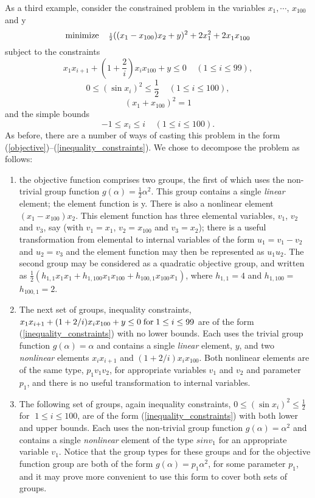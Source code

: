 \documentclass[a4paper]{article}
\newcommand{\beqn}[1]{\begin{equation}\label{#1}}
\newcommand{\eeqn}{\end{equation}}
\newcommand{\req}[1]{(\ref{#1})}
\newcommand{\ms}{\;\;\;\;}
\newcommand{\sfrac}[2]{{\scriptstyle \frac{#1}{#2}}}
\newcommand{\half}{\sfrac{1}{2}}
\begin{document}
As a third example, consider the constrained problem in the variables
$x_1 ,\cdots$, $x_{100}$ and y
\beqn{1.6.1}
{\rm minimize} \ms \half ((x_1 - x_{100}) x_2 + y)^2 +
2 x_1^2 + 2 x_1^{ } x_{100}^{ }
\eeqn
subject to the constraints
\beqn{1.6.2}
x_1 x_{i + 1} + (1 +
{\scriptstyle \frac{2}{i}}) x_i x_{100} + y \leq 0 \ms (1 \leq i \leq 99),
\eeqn
\beqn{1.6.3}
0 \leq (\sin x_i)^2 \leq \half \ms (1 \leq i \leq 100),
\eeqn
\beqn{1.6.4}
(x_1 + x_{100} )^2 = 1
\eeqn
and the simple bounds
\beqn{1.6.5}
-1 \leq x_i \leq i \ms (1 \leq i \leq 100).
\eeqn
As before, there are a number of  ways of casting  this problem in the
form   \req{objective}--\req{inequality_constraints}.   We   chose  to
decompose the problem as follows:
\begin{enumerate}
\item
the objective function comprises two groups, the first of which
uses the  non-trivial group function
$g (\alpha ) = \half \alpha^2$.  This  group contains a  single {\em
linear} element;
the element function is y. There  is also a nonlinear element
$( x_1 -  x_{100} ) x_2 $. This   element  function has  three
elemental variables, $v_1$, $v_2$ and $v_3$, say (with  $v_1  = x_1$,
$v_2  = x_{100}$ and $v_3 =  x_2$);  there  is a useful transformation
from elemental to internal variables of the form $u_1 = v_1 - v_2$ and
$u_2 = v_3$ and the  element function may then  be represented as $u_1
u_2$. 
The second group may be considered as a quadratic
objective group, and written as
$\half( h_{1,1} x_1 x_1 + h_{1,100} x_1 x_{100}
 + h_{100,1} x_{100} x_1 )$,
where $h_{1,1} = 4$ and $h_{1,100} =$
$h_{100,1} = 2$.

\item
The next set of groups,
inequality  constraints,
$ x_1 x_{i+1} + (1 + 2/i) x_i x_{100} + y  \leq 0  \; {\rm  for} \; 1
\leq i \leq 99$ are of the form \req{inequality_constraints} with no lower
 bounds.
Each uses
the trivial group
function $g   ( \alpha )  = \alpha$  and contains a
single {\em linear} element,
$y$, and  two {\em nonlinear} elements
$x_i  x_{i+1}$ and $(1 + 2/i)
x_i x_{100}$.  Both nonlinear elements are of the  same type, $p_1 v_1
v_2$, for appropriate variables  $v_1$  and $v_2$  and parameter $p_1$,
and there is no useful transformation to internal variables.

\item
The following set of  groups,
again  inequality constraints,
$0 \leq (\sin{x_i})^2 \leq \half \;$ for $\; 1 \leq  i  \leq 100$, are of
the  form \req{inequality_constraints} with  both  lower  and   upper bounds.
Each uses the
non-trivial group  function
$g (\alpha  )  = \alpha^2$ and  contains a
single  {\em   nonlinear}  element
of   the type   $sin   v_1$  for an
appropriate variable $v_1$.   Notice  that  the group  types
for these
groups and for the  objective function group
are  both of the form $g( \alpha ) = p_1 \alpha^2$, for some parameter
$p_1$, and  it  may prove
more convenient to use this form to cover both sets of groups.


\end{enumerate}
\end{document}

